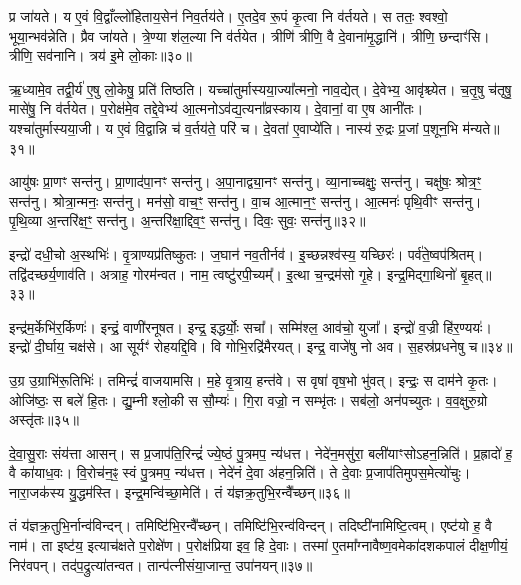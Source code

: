 प्र जा॑यते।
य ए॒वं वि॒द्वाँल्लो॑हिताय॒सेन॑ निव॒र्तय॑ते।
ए॒तदे॒व रू॒पं कृ॒त्वा नि व॑र्तयते।
स ततः॒ श्वश्वो॒ भूया॒न्भव॑न्नेति।
प्रैव जा॑यते।
त्रे॒ण्या श॑ल॒ल्या नि व॑र्तयेत।
त्रीणि॑ त्रीणि॒ वै दे॒वाना॑मृ॒द्धानि॑।
त्रीणि॒ छन्दाꣳ॑सि।
त्रीणि॒ सव॑नानि।
त्रय॑ इ॒मे लो॒काः॥३०॥\ip

ऋ॒ध्यामे॒व तद्वी॒र्य॑ ए॒षु लो॒केषु॒ प्रति॑ तिष्ठति।
यच्चा॑तुर्मास्य\-या॒ज्या᳚त्मनो॒ नाव॒द्येत्।
दे॒वेभ्य॒ आवृ॑श्च्येत।
च॒तृ॒षु च॑तृषु॒ मासे॑षु॒ नि व॑र्तयेत।
प॒रोक्ष॑मे॒व तद्दे॒वेभ्य॑ आ॒त्मनो\-ऽव॑द्य॒त्यना᳚\-व्रस्काय।
दे॒वानां॒ वा ए॒ष आनी॑तः।
यश्चा॑तुर्मास्यया॒जी।
य ए॒वं वि॒द्वान्नि च॑ व॒र्तय॑ते॒ परि॑ च।
दे॒वता॑ ए॒वाप्ये॑ति।
नास्य॑ रु॒द्रः प्र॒जां प॒शून॒भि म॑न्यते॥३१॥\ip\anuvakamend[ए॒त्ये॒त्य॒यु॒ञ्ज॒तासु॑रा एति लो॒का म॑न्यते]

आयु॑षः प्रा॒णꣳ सन्त॑नु।
प्रा॒णाद॑पा॒नꣳ सन्त॑नु।
अ॒पा॒नाद्व्या॒नꣳ सन्त॑नु।
व्या॒नाच्चक्षुः॒ सन्त॑नु।
चक्षु॑षः॒ श्रोत्र॒ꣳ॒ सन्त॑नु।
श्रोत्रा॒न्मनः॒ सन्त॑नु।
मन॑सो॒ वाच॒ꣳ॒ सन्त॑नु।
वा॒च आ॒त्मान॒ꣳ॒ सन्त॑नु।
आ॒त्मनः॑ पृथि॒वीꣳ सन्त॑नु।
पृ॒थि॒व्या अ॒न्तरि॑क्ष॒ꣳ॒ सन्त॑नु।
अ॒न्तरि॑क्षा॒द्दिव॒ꣳ॒ सन्त॑नु।
दिवः॒ सुवः॒ सन्त॑नु॥३२॥\ip\anuvakamend[अ॒न्तरि॑क्ष॒ꣳ॒ सन्त॑नु॒ द्वे च॑]

इन्द्रो॑ दधी॒चो अ॒स्थभिः॑।
वृ॒त्राण्यप्र॑तिष्कुतः।
ज॒घान॑ नव॒तीर्नव॑।
इ॒च्छन्नश्व॑स्य॒ यच्छिरः॑।
पर्व॑ते॒ष्वप॑श्रितम्।
तद्वि॑दच्छर्य॒णाव॑ति।
अत्राह॒ गोरम॑न्वत।
नाम॒ त्वष्टु॑रपी॒च्यम्᳚।
इ॒त्था च॒न्द्रम॑सो गृ॒हे।
इन्द्र॒मिद्गा॒थिनो॑ बृ॒हत्॥३३॥\ip

इन्द्र॑म॒र्केभि॑र॒र्किणः॑।
इन्द्रं॒ वाणी॑रनूषत।
इन्द्र॒ इद्धर्योः॒ सचा᳚।
सम्मि॑श्ल॒ आव॑चो॒ युजा᳚।
इन्द्रो॑ व॒ज्री हि॑र॒ण्ययः॑।
इन्द्रो॑ दी॒र्घाय॒ चक्ष॑से।
आ सूर्यꣳ॑ रोहयद्दि॒वि।
वि गोभि॒रद्रि॑मैरयत्।
इन्द्र॒ वाजे॑षु नो अव।
स॒हस्र॑प्रधनेषु च॥३४॥\ip

उ॒ग्र उ॒ग्राभि॑रू॒तिभिः॑।
तमिन्द्रं॑ वाजयामसि।
म॒हे वृ॒त्राय॒ हन्त॑वे।
स वृषा॑ वृष॒भो भु॑वत्।
इन्द्रः॒ स दाम॑ने कृ॒तः।
ओजि॑ष्ठः॒ स बले॑ हि॒तः।
द्यु॒म्नी श्लो॒की स सौ॒म्यः॑।
गि॒रा वज्रो॒ न सम्भृ॑तः।
सब॑लो॒ अन॑पच्युतः।
व॒व॒क्षुरु॒ग्रो अस्तृ॑तः॥३५॥\ip\anuvakamend[बृ॒हच्चास्तृ॑तः]

दे॒वा॒सु॒राः संय॑त्ता आसन्।
स प्र॒जा\-प॑ति॒रिन्द्रं॑ ज्ये॒ष्ठं पु॒त्रमप॒ न्य॑धत्त।
नेदे॑न॒मसु॑रा॒ बली॑याꣳसो\-ऽहन॒न्निति॑।
प्र॒ह्रादो॑ ह॒ वै का॑याध॒वः।
वि॒रोच॑न॒ꣴ॒ स्वं पु॒त्रमप॒ न्य॑धत्त।
नेदे॑नं दे॒वा अ॑हन॒न्निति॑।
ते दे॒वाः प्र॒जा\-प॑तिमुपस॒मेत्यो॑चुः।
नारा॒जक॑स्य यु॒द्धम॑स्ति।
इन्द्र॒मन्वि॑च्छा॒मेति॑।
तं य॑ज्ञक्र॒तुभि॒रन्वै᳚च्छन्॥३६॥\ip

तं य॑ज्ञक्र॒तुभि॒र्नान्व॑विन्दन्।
तमिष्टि॑भि॒रन्वै᳚च्छन्।
तमिष्टि॑भि॒रन्व॑\-विन्दन्।
तदिष्टी॑नामिष्टि॒\-त्वम्।
एष्ट॑यो ह॒ वै नाम॑।
ता इष्ट॑य॒ इत्याच॑क्षते प॒रोक्षे॑ण।
प॒रोक्ष॑प्रिया इव॒ हि दे॒वाः।
तस्मा॑ ए॒तमा᳚ग्नावैष्ण॒वमेका॑\-दश\-कपालं दीक्ष॒णीयं॒ निर॑वपन्।
तद॑प॒द्रुत्या॑तन्वत।
तान्प॑त्नीसंया॒जान्त॒ उपा॑नयन्॥३७॥\ip

